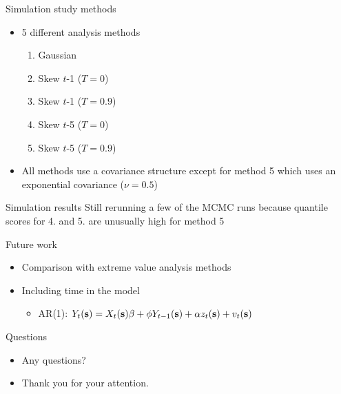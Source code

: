 \documentclass{beamer}
\begin{document}
\begin{frame}{Simulation study methods}
  \begin{itemize} \setlength{\itemsep}{0.5em}
    \item 5 different analysis methods
    \begin{enumerate}[1.]
      \item Gaussian
      \item Skew $t$-1 ($T=0$)
      \item Skew $t$-1 ($T=0.9$)
      \item Skew $t$-5 ($T=0$)
      \item Skew $t$-5 ($T=0.9$)
    \end{enumerate}
    \item All methods use a \Matern covariance structure except for method 5 which uses an exponential covariance ($\nu = 0.5$)
  \end{itemize}
\end{frame}

\begin{frame}{Simulation results}
  Still rerunning a few of the MCMC runs because quantile scores for 4. and 5. are
  unusually high for method 5
\end{frame}

\begin{frame}{Future work}
  \begin{itemize} \setlength{\itemsep}{0.5em}
    \item Comparison with extreme value analysis methods
    \item Including time in the model
    \begin{itemize}
      \item AR(1): $Y_t(\mbox{\bf s}) = X_t(\mbox{\bf s}) \beta + \phi Y_{t-1}(\mbox{\bf s}) + \alpha z_t(\mbox{\bf s}) + v_t(\mbox{\bf s})$
    \end{itemize}
  \end{itemize}
\end{frame}

\begin{frame}{Questions}
  \begin{itemize} \setlength{\itemsep}{0.5em}
    \item Any questions?
    \item Thank you for your attention.
  \end{itemize}
\end{frame}
\end{document}
